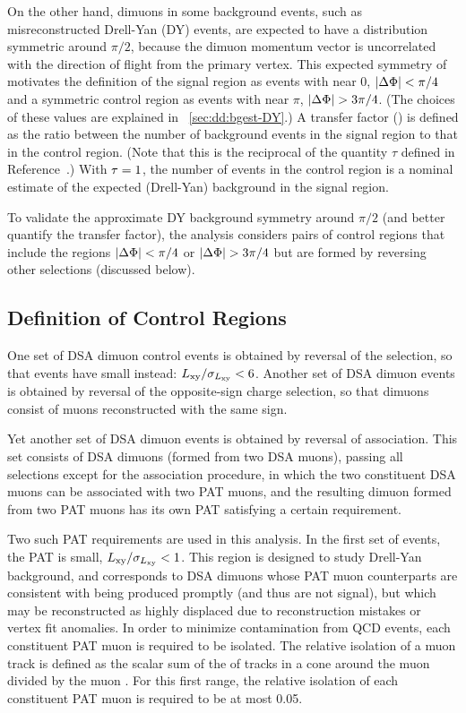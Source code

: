 On the other hand, dimuons in some background events, such as misreconstructed Drell-Yan (DY) events, are expected to have a \DeltaPhi distribution symmetric around $\pi/2$, because the dimuon momentum vector is uncorrelated with the direction of flight from the primary vertex.
This expected symmetry of \DeltaPhi motivates the definition of the signal region as events with \DeltaPhi near 0, \ie $|\Delta\Phi| < \pi/4$ and a symmetric control region as events with \DeltaPhi near $\pi$, \ie $|\Delta\Phi| > 3\pi/4$.
(The choices of these values are explained in \Sec~\ref{sec:dd:bgest-DY}.)
A transfer factor (\TF) is defined as the ratio between the number of background events in the signal region to that in the control region.
(Note that this is the reciprocal of the quantity $\tau$ defined in Reference~\cite{Cousins:ZBi2008}.)
With $\tau = 1$, the number of events in the control region is a nominal estimate of the expected (Drell-Yan) background in the signal region.

\pagebreak
To validate the approximate DY background symmetry around $\pi/2$ (and better quantify the transfer factor), the analysis considers pairs of control regions that include the regions $|\Delta\Phi| < \pi/4$ or $|\Delta\Phi| > 3\pi/4$ but are formed by reversing other selections (discussed below).

\subsection{Definition of Control Regions}
One set of DSA dimuon control events is obtained by reversal of the \LxySig selection, so that events have small \LxySig instead: $L_{\mathrm{xy}}/\sigma_{L_{\mathrm{xy}}} < 6$.
Another set of DSA dimuon events is obtained by reversal of the opposite-sign charge selection, so that dimuons consist of muons reconstructed with the same sign.

Yet another set of DSA dimuon events is obtained by reversal of \DSAToPAT association.
This set consists of DSA dimuons (formed from two DSA muons), passing all selections except for the \DSAToPAT association procedure, in which the two constituent DSA muons can be associated with two PAT muons, and the resulting dimuon formed from two PAT muons has its own PAT \LxySig satisfying a certain requirement.

Two such PAT \LxySig requirements are used in this analysis.
In the first set of events, the PAT \LxySig is small, \eg $L_{\mathrm{xy}}/\sigma_{L_{\mathrm{xy}}} < 1$.
This region is designed to study Drell-Yan background, and corresponds to DSA dimuons whose PAT muon counterparts are consistent with being produced promptly (and thus are not signal), but which may be reconstructed as highly displaced due to reconstruction mistakes or vertex fit anomalies.
In order to minimize contamination from QCD events, each constituent PAT muon is required to be isolated.
The relative isolation of a muon track is defined as the scalar sum of the \pT of tracks in a \DeltaR cone around the muon divided by the muon \pT.
For this first range, the relative isolation of each constituent PAT muon is required to be at most 0.05.

